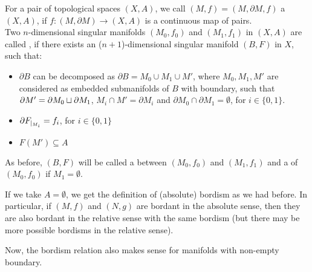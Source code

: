 \documentclass[a4paper,12pt]{article}
\begin{document}
\begin{definition}
    For a pair of topological spaces \((X,A)\), we call \((M,f)=(M,\partial M,f)\) a \((X,A)\), if \(f:(M,\partial M)\to (X,A)\) is a continuous map of pairs.\\
    Two \(n\)-dimensional singular manifolds \((M_0,f_0)\) and \((M_1,f_1)\) in \((X,A)\) are called , if there exists an (\(n+1\))-dimensional singular manifold \((B,F)\) in \(X\), such that:
    \begin{itemize}
        \item \(\partial B\) can be decomposed as  \(\partial B=M_0\cup M_1\cup M'\), where \(M_0,M_1,M'\) are considered as embedded submanifolds of \(B\) with boundary, such that 
        \(\partial M'=\partial M_0\sqcup \partial M_1\), 
        \(M_i\cap M'=\partial M_i\) and \(\partial M_0
        \cap\partial M_1=\emptyset\), for \(i\in\{0,1\}\).

        \item \(\partial F_{|_{M_i}}=f_i\), for \(i\in\{0,1\}\)

        \item \(F(M')\subseteq A\)
    \end{itemize}
    As before, \((B,F)\) will be called a  between \((M_0,f_0)\) and \((M_1,f_1)\) and a  of \((M_0,f_0)\) if \(M_1=\emptyset\).
\end{definition}

\begin{remark}
    If we take \(A=\emptyset\), we get the definition of (absolute) bordism as we had before. In particular, if \((M,f)\) and \((N,g)\) are bordant in the absolute sense, then they are also bordant in the relative sense with the same bordism (but there may be more possible bordisms in the relative sense).
\end{remark}


    Now, the bordism relation also makes sense for manifolds with non-empty boundary.
\end{document}
